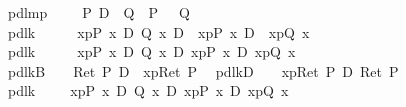 \begin{isabellebody}
\ \ pdl{\isacharunderscore}mp{\isacharunderscore}{\isacharcolon}\ \ \ \ {\isachardoublequote}{\isasymlbrakk}{\isasymturnstile}\ {\isacharparenleft}P\ {\isasymlongrightarrow}\isactrlsub D\ \ Q{\isacharparenright}{\isacharsemicolon}\ {\isasymturnstile}\ P{\isasymrbrakk}\ {\isasymLongrightarrow}\ {\isasymturnstile}\ Q{\isachardoublequote}\ \ %
\isanewline
\ \isanewline
\ \ pdl{\isacharunderscore}k{}{\isacharcolon}\ \ \ \ {\isachardoublequote}{\isasymturnstile}\ {\isacharbrackleft}{\isacharhash}\ x{\isasymleftarrow}p{\isacharbrackright}{\isacharparenleft}P\ x\ {\isasymlongrightarrow}\isactrlsub D\ Q\ x{\isacharparenright}\ {\isasymlongrightarrow}\isactrlsub D\ {\isacharbrackleft}{\isacharhash}\ x{\isasymleftarrow}p{\isacharbrackright}{\isacharparenleft}P\ x{\isacharparenright}\ {\isasymlongrightarrow}\isactrlsub D\ {\isacharbrackleft}{\isacharhash}\ x{\isasymleftarrow}p{\isacharbrackright}{\isacharparenleft}Q\ x{\isacharparenright}{\isachardoublequote}\isanewline
\ \ pdl{\isacharunderscore}k{}{\isacharcolon}\ \ \ \ {\isachardoublequote}{\isasymturnstile}\ {\isacharbrackleft}{\isacharhash}\ x{\isasymleftarrow}p{\isacharbrackright}{\isacharparenleft}P\ x\ {\isasymlongrightarrow}\isactrlsub D\ Q\ x{\isacharparenright}\ {\isasymlongrightarrow}\isactrlsub D\ {\isasymlangle}x{\isasymleftarrow}p{\isasymrangle}{\isacharparenleft}P\ x{\isacharparenright}\ {\isasymlongrightarrow}\isactrlsub D\ {\isasymlangle}x{\isasymleftarrow}p{\isasymrangle}{\isacharparenleft}Q\ x{\isacharparenright}{\isachardoublequote}\isanewline
\ \ pdl{\isacharunderscore}k{}B{\isacharcolon}\ \ \ {\isachardoublequote}{\isasymturnstile}\ Ret\ P\ {\isasymlongrightarrow}\isactrlsub D\ {\isacharbrackleft}{\isacharhash}\ x{\isasymleftarrow}p{\isacharbrackright}{\isacharparenleft}Ret\ P{\isacharparenright}{\isachardoublequote}\isanewline
\ \ pdl{\isacharunderscore}k{}D{\isacharcolon}\ \ \ {\isachardoublequote}{\isasymturnstile}\ {\isasymlangle}x{\isasymleftarrow}p{\isasymrangle}{\isacharparenleft}Ret\ P{\isacharparenright}\ {\isasymlongrightarrow}\isactrlsub D\ Ret\ P{\isachardoublequote}\isanewline
\ \ pdl{\isacharunderscore}k{}{\isacharcolon}\ \ \ \ {\isachardoublequote}{\isasymturnstile}\ {\isasymlangle}x{\isasymleftarrow}p{\isasymrangle}{\isacharparenleft}P\ x\ {\isasymor}\isactrlsub D\ Q\ x{\isacharparenright}\ {\isasymlongrightarrow}\isactrlsub D\ {\isacharparenleft}{\isasymlangle}x{\isasymleftarrow}p{\isasymrangle}{\isacharparenleft}P\ x{\isacharparenright}\ {\isasymor}\isactrlsub D\ {\isasymlangle}x{\isasymleftarrow}p{\isasymrangle}{\isacharparenleft}Q\ x{\isacharparenright}{\isacharparenright}{\isachardoublequote}\isanewline

\end{isabellebody}

